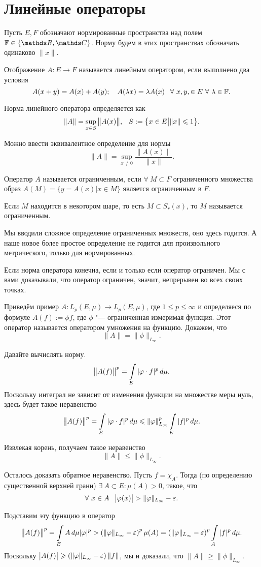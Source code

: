 \section{Линейные операторы}
Пусть $E,F$ обозначают нормированные пространства над полем $\F\in\{\R,\C\}$. Норму будем в этих пространствах обозначать одинаково $\|x\|$.
\begin{Def}
  Отображение $A\colon E\to F$ называется линейным оператором, если выполнено два условия
\[
  A(x+y) = A(x)+A(y);\quad A(\lambda x) = \lambda A(x)\hskip .75em plus.1em minus.08em\relax\forall\ x,y,\in E\ \forall\ \lambda\in\mathbb F.
\]

Норма линейного оператора определяется как 
\[
  \|A\| = \sup\limits_{x\in S}\big\|A(x)\big\|,\hskip .75em plus.1em minus.08em\relax S:=\big\{x\in E\big|\|x\|\leqslant 1\big\}.
\]
\end{Def}

Можно ввести эквивалентное определение для нормы
\[
  \|A\| = \sup\limits_{x\ne0}\frac{\big\|A(x)\|}{\|x\|}.
\]
\begin{Def}
  Оператор $A$ называется ограниченным, если $\forall\ M\subset F$ ограниченного множества образ $A(M) = \big\{y = A(x)\big| x\in M\big\}$ является ограниченным в $F$.
\end{Def}

\begin{Def}
 Если $M$ находится в некотором шаре, то есть $M \subset S_r(x)$, то $M$ называется ограниченным.
\end{Def}

Мы вводили сложное определение ограниченных множеств, оно здесь годится. А наше новое более простое определение не годится для произвольного метрического, только для нормированных.

Если норма оператора конечна, если и только если оператор ограничен. Мы с вами доказывали, что оператор ограничен, значит, непрерывен во всех своих точках.

Приведём пример $A\colon L_p(E,\mu)\to L_p(E,\mu)$, где $1\le p\le\infty$ и определяеся по формуле $A(f):=\phi f$, где $\phi$ "--- ограниченная измеримая функция. Этот оператор называется оператором умножения на функцию. Докажем, что
\[
  \|A\| = \|\phi\|_{L_\infty}.
\]
\begin{Proof}
Давайте вычислять норму. 
\[
  \big\|A(f)\big\|^p = \int\limits_{E}|\varphi\cdot f|^p\,d\mu.
\]
Поскольку интеграл не зависит от изменения функции на множестве меры нуль, здесь будет такое неравенство
\[
  \big\|A(f)\big\|^p = \int\limits_{E}|\varphi\cdot f|^p\,d\mu\leqslant \|\varphi\|^p_{L_\infty}\int\limits_{E}|f|^p\,d\mu.
\]

Извлекая корень, получаем такое неравенство
\[
  \|A\|\le \|\phi\|_{L_\infty}.
\]

Осталось доказать обратное неравенство. Пусть $f= \chi_A$. Тогда (по определению существенной верхней грани) $\exists\ A\subset E\colon \mu(A)>0$, такое, что 
\[
  \forall\ x\in A\pau \big|\phi(x)\big|>\|\phi\|_{L_\infty}-\e.
\]

Подставим эту функцию в оператор
\[
  \big\|A(f)\big\|^p = \int\limits_{E}A\,d\mu{|\varphi|^p}>\left(\|\varphi\|_{L_\infty}-\varepsilon\right)^p\mu(A) = 
    \left(\|\varphi\|_{L_\infty}-\varepsilon\right)^p\int\limits_{A}|f|^p\,d\mu.
\]
Поскольку $\big|A(f)\big|\geqslant \left(\|\varphi\|_{L_\infty}-\varepsilon\right)\|f\|$, мы и доказали, что $\|A\|\ge \|\phi\|_{L_\infty}$.
\end{Proof}


